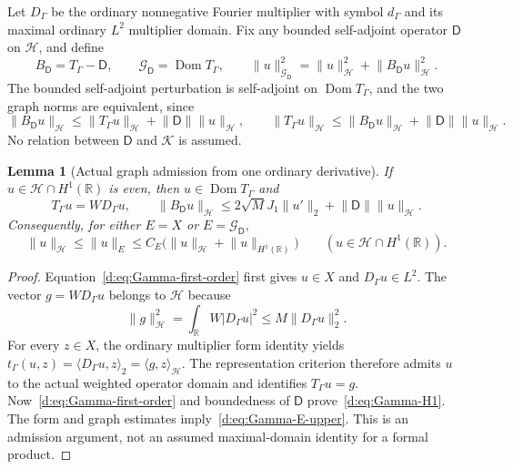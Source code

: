\documentclass[11pt,a4paper]{article}
\numberwithin{equation}{section}
\newtheorem{lemma}[theorem]{Lemma}
\theoremstyle{definition}\newtheorem{definition}[theorem]{Definition}
\theoremstyle{remark}\newtheorem{remark}[theorem]{Remark}
\newcommand{\R}{\mathbb R}\newcommand{\C}{\mathbb C}\newcommand{\N}{\mathbb N}
\newcommand{\Hh}{\mathcal H}\newcommand{\Hw}{\mathcal H}
\newcommand{\tg}{t_\Gamma}\newcommand{\cg}{c_\Gamma}
\newcommand{\ip}[2]{\langle#1,#2\rangle}\newcommand{\norm}[1]{\lVert#1\rVert}\newcommand{\abs}[1]{\lvert#1\rvert}
\newcommand{\Kk}{\mathcal K}\newcommand{\Aa}{\mathcal A}\newcommand{\Ff}{\mathcal F}
\begin{document}
Let $D_\Gamma$ be the ordinary nonnegative Fourier multiplier with symbol $d_\Gamma$ and its maximal ordinary $L^2$ multiplier domain. Fix any bounded self-adjoint operator $\mathsf D$ on $\Hh$, and define
\begin{equation}\label{d:eq:Gamma-graph}
 B_{\mathsf D}=T_\Gamma-\mathsf D,\qquad
 \mathcal G_{\mathsf D}=\operatorname{Dom}T_\Gamma,
 \qquad
 \norm{u}_{\mathcal G_{\mathsf D}}^2
 =\norm{u}_{\Hh}^2+\norm{B_{\mathsf D}u}_{\Hh}^2.
\end{equation}
The bounded self-adjoint perturbation is self-adjoint on $\operatorname{Dom}T_\Gamma$, and the two graph norms are equivalent, since
\[
 \norm{B_{\mathsf D}u}_{\Hh}\le\norm{T_\Gamma u}_{\Hh}
       +\norm{\mathsf D}\norm{u}_{\Hh},\qquad
 \norm{T_\Gamma u}_{\Hh}\le\norm{B_{\mathsf D}u}_{\Hh}
       +\norm{\mathsf D}\norm{u}_{\Hh}.
\]
No relation between $\mathsf D$ and $\Kk$ is assumed.

\begin{lemma}[Actual graph admission from one ordinary derivative]\label{d:lem:Gamma-H1}
If $u\in\Hh\cap H^1(\R)$ is even, then $u\in\operatorname{Dom}T_\Gamma$ and
\begin{equation}\label{d:eq:Gamma-H1}
 T_\Gamma u=W D_\Gamma u,\qquad
 \norm{B_{\mathsf D}u}_{\Hh}
 \le2\sqrt M J_1\norm{u'}_2+\norm{\mathsf D}\norm{u}_{\Hh}.
\end{equation}
Consequently, for either $E={X}$ or $E=\mathcal G_{\mathsf D}$,
\begin{equation}\label{d:eq:Gamma-E-upper}
 \norm{u}_{\Hh}\le\norm{u}_E
 \le C_E\bigl(\norm{u}_{\Hh}+\norm{u}_{H^1(\R)}\bigr)
 \qquad(u\in\Hh\cap H^1(\R)).
\end{equation}
\end{lemma}
\begin{proof}
Equation~\eqref{d:eq:Gamma-first-order} first gives $u\in{X}$ and $D_\Gamma u\in L^2$. The vector $g=WD_\Gamma u$ belongs to $\Hh$ because
\[
 \norm{g}_{\Hh}^2=\int_\R W|D_\Gamma u|^2
 \le M\norm{D_\Gamma u}_2^2.
\]
For every $z\in{X}$, the ordinary multiplier form identity yields
$\tg(u,z)=\ip{D_\Gamma u}{z}_2=\ip{g}{z}_{\Hh}$.
The representation criterion therefore admits $u$ to the actual weighted operator domain and identifies $T_\Gamma u=g$. Now~\eqref{d:eq:Gamma-first-order} and boundedness of $\mathsf D$ prove~\eqref{d:eq:Gamma-H1}. The form and graph estimates imply~\eqref{d:eq:Gamma-E-upper}. This is an admission argument, not an assumed maximal-domain identity for a formal product.
\end{proof}
\end{document}
